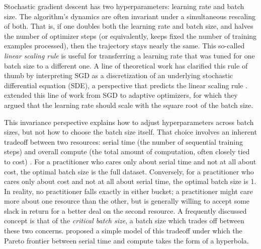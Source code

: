 Stochastic gradient descent has two hyperparameters: learning rate and batch size.  The algorithm's dynamics are often invariant under a simultaneous rescaling of both.  That is, if one doubles both the learning rate and batch size, and halves the number of optimizer steps (or equivalently, keeps fixed the number of training examples processed), then the trajectory stays nearly the same.  This so-called \emph{linear scaling rule} \citep{goyal2017accurate} is useful for transferring a learning rate that was tuned for one batch size to a different one.
A line of theoretical work has clarified this rule of thumb by interpreting SGD as a discretization of an underlying stochastic differential equation (SDE), a perspective that predicts the linear scaling rule \citep{mandt2017stochastic, jastrzkebski2017three, chaudhari2018stochastic, li2019stochastic, li2021validitymodelingsgdstochastic}.
\citet{malladi2022sde} extended this line of work from SGD to adaptive optimizers, for which they argued that the learning rate should scale with the square root of the batch size.

This invariance perspective explains how to adjust hyperparameters across batch sizes, but not how to choose the batch size itself. That choice involves an inherent tradeoff between two resources: serial time (the number of sequential training steps) and overall compute (the total amount of computation, often closely tied to cost) \citep{ma2018power,jain2018parallelizing,mccandlish2018empirical, shallue2019measuring}.
For a practitioner who cares only about serial time and not at all about cost, the optimal batch size is the full dataset.  Conversely, for a practitioner who cares only about cost and not at all about serial time, the optimal batch size is 1.  In reality, no practitioner falls exactly in either bucket; a practitioner might care more about one resource than the other, but is generally willing to accept some slack in return for a better deal on the second resource. A frequently discussed concept is that of the \emph{critical batch size}, a batch size which trades off between these two concerns.
\citet{mccandlish2018empirical} proposed a simple model of this tradeoff under which the Pareto frontier between serial time and compute takes the form of a hyperbola.

